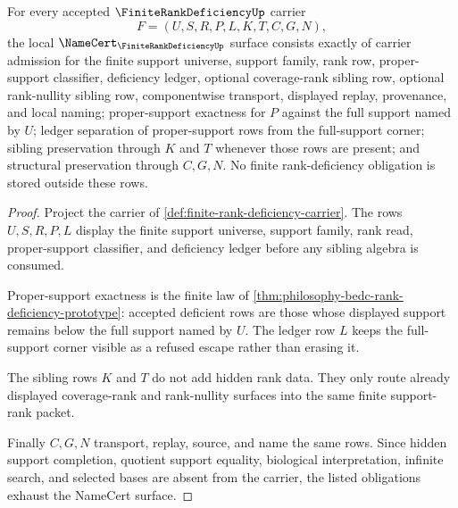 \begin{theorem}
\label{thm:finite-rank-deficiency-namecert-obligations}
For every accepted $\FiniteRankDeficiencyUp$ carrier
$$
F=(U,S,R,P,L,K,T,C,G,N),
$$
the local $\NameCert_{\FiniteRankDeficiencyUp}$ surface consists exactly of carrier admission for the finite support universe, support family, rank row, proper-support classifier, deficiency ledger, optional coverage-rank sibling row, optional rank-nullity sibling row, componentwise transport, displayed replay, provenance, and local naming; proper-support exactness for $P$ against the full support named by $U$; ledger separation of proper-support rows from the full-support corner; sibling preservation through $K$ and $T$ whenever those rows are present; and structural preservation through $C,G,N$. No finite rank-deficiency obligation is stored outside these rows.
\end{theorem}
\begin{proof}
Project the carrier of \autoref{def:finite-rank-deficiency-carrier}. The rows $U,S,R,P,L$ display the finite support universe, support family, rank read, proper-support classifier, and deficiency ledger before any sibling algebra is consumed.

Proper-support exactness is the finite law of \autoref{thm:philosophy-bedc-rank-deficiency-prototype}: accepted deficient rows are those whose displayed support remains below the full support named by $U$. The ledger row $L$ keeps the full-support corner visible as a refused escape rather than erasing it.

The sibling rows $K$ and $T$ do not add hidden rank data. They only route already displayed coverage-rank and rank-nullity surfaces into the same finite support-rank packet.

Finally $C,G,N$ transport, replay, source, and name the same rows. Since hidden support completion, quotient support equality, biological interpretation, infinite search, and selected bases are absent from the carrier, the listed obligations exhaust the NameCert surface.
\end{proof}

